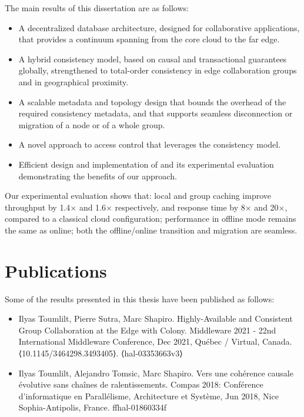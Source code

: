 The main results of this dissertation are as follows:
\begin{itemize}[leftmargin=*]
\item
  A decentralized database architecture, designed for collaborative
  applications, that provides a continuum spanning from the core cloud
  to the far edge.
\item
  A hybrid consistency model, based on causal and transactional 
  guarantees globally, strengthened to total-order consistency in edge
  collaboration groups and in geographical proximity.
\item
  A scalable metadata and topology design that bounds the overhead of 
  the required consistency metadata, and that supports seamless
  disconnection or migration of a node or of a whole group.
\item
  A novel approach to access control that leverages the consistency
  model.
\item
  Efficient design and implementation of \system{} and
  its experimental evaluation demonstrating the benefits of
  our approach.
\end{itemize}

Our experimental evaluation shows that:
local and group caching improve throughput by 1.4$\times$ and
1.6$\times$ respectively, and response time by 8$\times$ and 20$\times$,
compared to a classical cloud configuration;
performance in offline mode remains the same as online;
both the offline{\slash}online transition and migration are seamless.

\section{Publications}
\label{sec:intro:publications}

Some of the results presented in this thesis have been published as follows:

\begin{itemize}
  \item Ilyas Toumlilt, Pierre Sutra, Marc Shapiro. Highly-Available and Consistent Group Collaboration at the Edge with Colony. Middleware 2021 - 22nd International Middleware Conference, Dec 2021, Québec / Virtual, Canada. ⟨10.1145/3464298.3493405⟩. ⟨hal-03353663v3⟩ \cite{toumlilt:hal-03353663}
  \item Ilyas Toumlilt, Alejandro Tomsic, Marc Shapiro. Vers une cohérence causale évolutive sans chaînes de
  ralentissements. Compas 2018: Conférence d'informatique en Parallélisme, Architecture et Système,
  Jun 2018, Nice Sophia-Antipolis, France. ffhal-01860334f \cite{toumlilt:hal-01860334}
\end{itemize}

